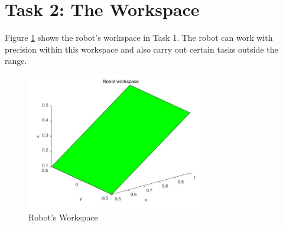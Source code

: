 \section{Task 2: The Workspace}
\FloatBarrier %

Figure \ref{F 3.1} shows the robot's workspace in Task 1. The robot can work with precision within this workspace and also carry out certain tasks outside the range.


\begin{figure}[htbp]
    \centering
    \includegraphics[width=8cm]{./fig/workspace.jpg}
    \caption{Robot's Workspace}
    \label{F 3.1}
\end{figure}





